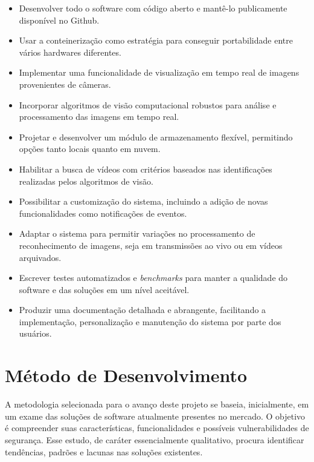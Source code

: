 \documentclass[12pt, %
openright, 
oneside, %
a4paper,    %
brazil]{facom-ufu-abntex2}
\begin{document}
\begin{itemize}
	\item Desenvolver todo o software com código aberto e mantê-lo publicamente
	      disponível no Github.
	\item Usar a conteinerização como estratégia para conseguir portabilidade entre
	      vários hardwares diferentes.
	\item Implementar uma funcionalidade de visualização em tempo real de imagens
	      provenientes de câmeras.
	\item Incorporar algoritmos de visão computacional robustos para análise e
	      processamento das imagens em tempo real.
	\item Projetar e desenvolver um módulo de armazenamento flexível, permitindo opções
	      tanto locais quanto em nuvem.
	\item Habilitar a busca de vídeos com critérios baseados nas identificações
	      realizadas pelos algoritmos de visão.
	\item Possibilitar a customização do sistema, incluindo a adição de novas
	      funcionalidades como notificações de eventos.
	\item Adaptar o sistema para permitir variações no processamento de reconhecimento de
	      imagens, seja em transmissões ao vivo ou em vídeos arquivados.
	\item Escrever testes automatizados e \textit{\foreignlanguage{english}{benchmarks}}
	      para manter a qualidade do software e das soluções em um nível aceitável.
	\item Produzir uma documentação detalhada e abrangente, facilitando a implementação,
	      personalização e manutenção do sistema por parte dos usuários.
\end{itemize}


\chapter{Método de Desenvolvimento}

A metodologia selecionada para o avanço deste projeto se baseia, inicialmente,
em um exame das soluções de software atualmente presentes no mercado. O
objetivo é compreender suas características, funcionalidades e possíveis
vulnerabilidades de segurança. Esse estudo, de caráter essencialmente
qualitativo, procura identificar tendências, padrões e lacunas nas soluções
existentes.
\end{document}
